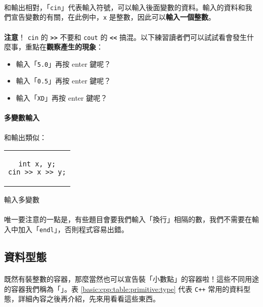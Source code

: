 \documentclass[12pt,a4paper,oneside]{report}
\begin{document}
\begin{CJK}{UTF8}{bkai}
\paragraph{}和輸出相對，「\lstinline!cin!」代表輸入符號，可以輸入後面變數的資料。輸入的資料和我們宣告變數的有關，在此例中，\lstinline!x! 是整數，因此可以\textbf{輸入一個整數}。
\paragraph{}{\color{red}\textbf{注意}}！ \lstinline!cin! 的 \textbf{\lstinline!>>!} 不要和 \lstinline!cout! 的 \textbf{\lstinline!<<!} 搞混。以下練習讀者們可以試試看會發生什麼事，重點在\textbf{觀察產生的現象}：

\begin{itemize}
\item 輸入「\texttt{5.0}」再按 enter 鍵呢？
\item 輸入「\texttt{0.5}」再按 enter 鍵呢？
\item 輸入「\texttt{XD}」再按 enter 鍵呢？
\end{itemize}

\paragraph{多變數輸入}和輸出類似：

\begin{code}[h!]
\centering
\begin{tabular}{c}
\begin{lstlisting}
int x, y;
cin >> x >> y;
\end{lstlisting}
\end{tabular}
\caption{輸入多變數}
\label{basic:cpp:code:cin:variables}
\end{code}

\paragraph{}唯一要注意的一點是，有些題目會要我們輸入「換行」相隔的數，我們不需要在輸入中加入「\lstinline!endl!」，否則程式容易出錯。

\subsection{資料型態}

\paragraph{}既然有裝整數的容器，那麼當然也可以宣告裝「小數點」的容器啦！這些不同用途的容器我們稱為「」。表 \ref{basic:cpp:table:primitive:type} 代表 \texttt{C++} 常用的資料型態，詳細內容之後再介紹，先來用看看這些東西。


\end{CJK}
\end{document}
